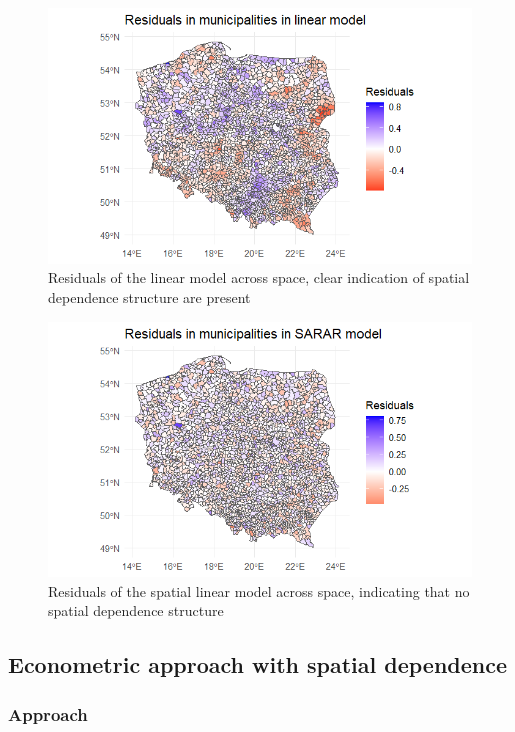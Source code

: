 \documentclass[a4paper,12pt]{article} %
\begin{document}
\begin{figure}[htp]
    \centering
    \includegraphics[width=1\textwidth]{assets/res_linear.png}
    \caption{Residuals of the linear model across space, clear indication of spatial dependence structure are present}
    \label{fig:res_linear}
\end{figure}

\begin{figure}[htp]
    \centering
    \includegraphics[width=1\textwidth]{assets/res_sarar.png}
    \caption{Residuals of the spatial linear model across space, indicating that no spatial dependence structure}
    \label{fig:res_sarar}
\end{figure}

\newpage
\subsection{Econometric approach with spatial dependence }

\subsubsection{Approach}
\end{document}
